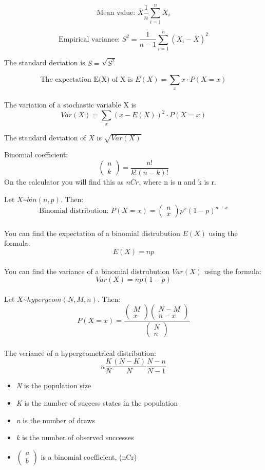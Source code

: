 \documentclass{article}
\begin{document}
\[
\text{Mean value: }
\overline{X}\frac{1}{n}\sum_{i=1}^n X_i
\]

\[
\text{Empirical variance: }
S^2 = \frac{1}{n-1}\sum_{i=1}^{n} (X_i - \overline{X})^2
\]


The standard deviation is $S=\sqrt{S^2}$

\[
\text{The expectation E(X) of X is }
E(X) = \sum_x x \cdot P(X=x) 
\]
\\
The variation of a stochastic variable X is
\[
Var(X)= \sum_x (x-E(X))^2 \cdot P(X=x)
\]

The standard deviation of $X$ is $\sqrt{Var(X)}$\\

\hfill \break

Binomial coefficient:
\[
\begin{pmatrix}n \\k \end{pmatrix} = \frac{n!}{k!(n-k)!}
\]
On the calculator you will find this as $nCr$, where n is n and k is r.

\hfill \break

Let $X$\textasciitilde $bin(n,p)$. Then:
\[
\text{Binomial distribution: }
P(X=x)=\begin{pmatrix}n \\ x \end{pmatrix} p^x(1-p)^{n-x}
\]
\\
You can find the expectation of a binomial distrubution $E(X)$ using the formula: 
\[
E(X)=np
\]
\\
You can find the variance of a binomial distrubution $Var(X)$ using the formula: 
\[
Var(X)=np(1-p)
\]
\\
Let $X$\textasciitilde $hypergeom(N,M,n)$. Then:
\[
P(X=x)=\frac{
	\begin{pmatrix}M \\ x \end{pmatrix} 
	\begin{pmatrix} N-M \\ n-x \end{pmatrix}
}{
	\begin{pmatrix}N \\ n \end{pmatrix}
}
\]
\\
The veriance of a hypergeometrical distribution:
\[
n\frac{K}{N}\frac{(N-K)}{N}\frac{N-n}{N-1}
\]
\begin{itemize}
	\item \emph{N} is the population size
	\item \emph{K} is the number of success states in the population
	\item \emph{n} is the number of draws
	\item \emph{k} is the number of observed successes
	\item $\begin{pmatrix}a \\ b \end{pmatrix}$ is a binomial coefficient, (nCr)
\end{itemize}
\end{document}

